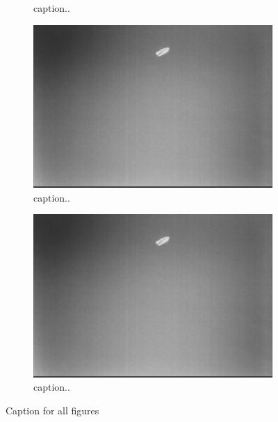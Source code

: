 \begin{figure}[ht]
\begin{subfigure}[b]{0.45\textwidth}
		\caption{caption..}
		\label{fig:2b}
	\end{subfigure}
	\begin{subfigure}[b]{0.45\textwidth}
		\includegraphics[width=\textwidth]{fig1}
		\caption{caption..}
		\label{fig:2c}
	\end{subfigure}
	\begin{subfigure}[b]{0.45\textwidth}
		\includegraphics[width=\textwidth]{fig1}
		\caption{caption..}
		\label{fig:2d}
	\end{subfigure}
	\caption{Caption for all figures}\label{fig:2}
\end{figure}
